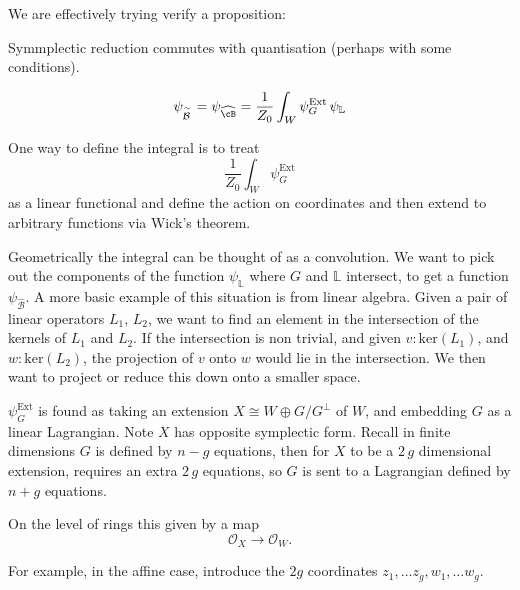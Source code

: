     
    We are effectively trying verify a proposition:
    \begin{prop}
    Symmplectic reduction commutes with quantisation (perhaps with some conditions).
    \end{prop}
    
    \begin{prop}
    \[ \psi_{\overset{\sim}{\mathcal{B}\,}} = \psi_{\widehat{\cB}} =\frac{1}{Z_0} \int_{W} \psi_G^{\mathrm{Ext}} \,  \psi_{\mathbb{L}}\]
    \end{prop}


    One way to define the integral is to treat 
    \[ \frac{1}{Z_0} \int_{W} \psi_G^{\text{Ext}}\]
    as a linear functional and define the action on coordinates and then extend to arbitrary functions via Wick's theorem. 
    
    Geometrically the integral can be thought of as a convolution. We want to pick out the components of the function \( \psi_{\mathbb{L}}\) where \(G\) and \( \mathbb{L}\) intersect, to get a function \( \psi_{\widehat{\mathcal{B}}}\). A more basic example of this situation is from linear algebra. Given a pair of linear operators \(L_1\), \(L_2\), we want to find an element in the intersection of the kernels of \(L_1\) and \(L_2\). If the intersection is non trivial, and given \( v : \mathrm{ker}(L_1)\), and \( w :\mathrm{ker}(L_2)\), the projection of \(v\) onto \(w\) would lie in the intersection. We then want to project or reduce this down onto a smaller space.
    
    
    \( \psi_G^{\text{Ext}} \) is found as taking an extension \(X \cong W \oplus G/G^{\perp}\) of \(W\), and embedding \(G\) as a linear Lagrangian. Note \(X\) has opposite symplectic form. Recall in finite dimensions \(G\) is defined by \(n-g\) equations, then for \(X\) to be a \(2\,g\) dimensional extension, requires an extra \(2
    \,g\) equations, so \(G\) is sent to a Lagrangian defined by \(n+g\) equations.
    
    On the level of rings this given by a map
    \[ \mathcal{O}_{X} \rightarrow \mathcal{O}_W. \]

    For example, in the affine case, introduce the \(2g\) coordinates \(z_1, \dots z_g, w_1, \dots w_g\).

